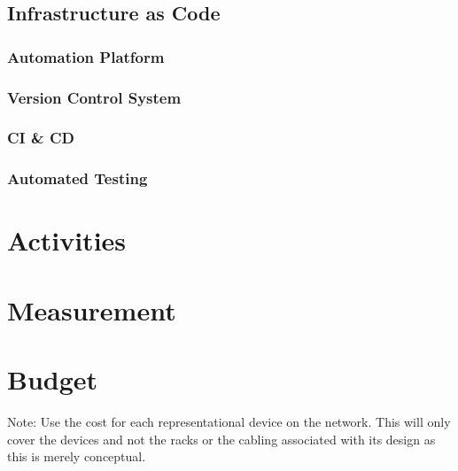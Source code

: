 \documentclass[12pt, letterpaper]{article}
\begin{document}
	\subsection{Infrastructure as Code}
		\subsubsection{Automation Platform}
		\subsubsection{Version Control System}
		\subsubsection{CI \& CD}
		\subsubsection{Automated Testing}
		

\newpage

\section{Activities}

\newpage

\section{Measurement}

\newpage

\section{Budget}
Note: Use the cost for each representational device on the network.
This will only cover the devices and not the racks or the cabling associated with its design as this is merely conceptual.
\end{document}
